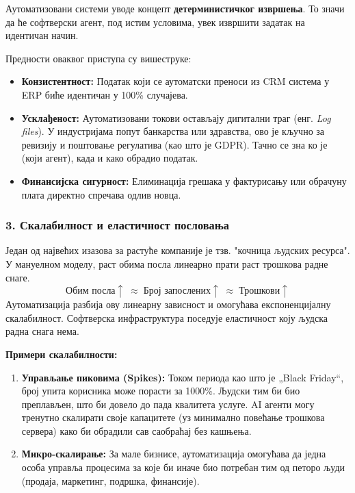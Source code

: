Аутоматизовани системи уводе концепт \textbf{детерминистичког извршења}. То значи да ће софтверски агент, под истим условима, увек извршити задатак на идентичан начин.

Предности оваквог приступа су вишеструке:
\begin{itemize}
    \item \textbf{Конзистентност:} Податак који се аутоматски преноси из CRM система у ERP биће идентичан у 100\% случајева.
    \item \textbf{Усклађеност:} Аутоматизовани токови остављају дигитални траг (енг. \textit{Log files}). У индустријама попут банкарства или здравства, ово је кључно за ревизију и поштовање регулатива (као што је GDPR). Тачно се зна ко је (који агент), када и како обрадио податак.
    \item \textbf{Финансијска сигурност:} Елиминација грешака у фактурисању или обрачуну плата директно спречава одлив новца.
\end{itemize}

\subsubsection*{3. Скалабилност и еластичност пословања}

Један од највећих изазова за растуће компаније је тзв. "кочница људских ресурса". У мануелном моделу, раст обима посла линеарно прати раст трошкова радне снаге.
$$
\text{Обим посла} \uparrow \;\approx\; \text{Број запослених} \uparrow \;\approx\; \text{Трошкови} \uparrow
$$
Аутоматизација разбија ову линеарну зависност и омогућава експоненцијалну скалабилност. Софтверска инфраструктура поседује еластичност коју људска радна снага нема.

\textbf{Примери скалабилности:}
\begin{enumerate}
    \item \textbf{Управљање пиковима (Spikes):} Током периода као што је „Black Friday“, број упита корисника може порасти за 1000\%. Људски тим би био преплављен, што би довело до пада квалитета услуге. AI агенти могу тренутно скалирати своје капацитете (уз минимално повећање трошкова сервера) како би обрадили сав саобраћај без кашњења.
    \item \textbf{Микро-скалирање:} За мале бизнисе, аутоматизација омогућава да једна особа управља процесима за које би иначе био потребан тим од петоро људи (продаја, маркетинг, подршка, финансије).
\end{enumerate}

